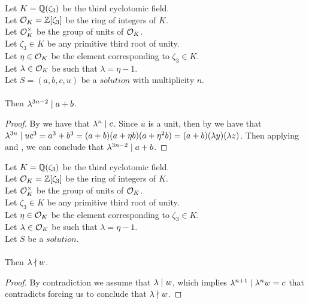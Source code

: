 \begin{lemma}
    \label{lmm:lambda_pow_dvd_a_add_b}
    \leanok
    Let $K = \mathbb{Q}(\zeta_3)$ be the third cyclotomic field. \\
    Let $\mathcal{O}_K = \mathbb{Z}[\zeta_3]$ be the ring of integers of $K$. \\
    Let $\mathcal{O}^\times_K$ be the group of units of $\mathcal{O}_K$. \\
    Let $\zeta_3 \in K$ be any primitive third root of unity. \\
    Let $\eta \in \mathcal{O}_K$ be the element corresponding to $\zeta_3 \in K$. \\
    Let $\lambda \in \mathcal{O}_K$ be such that $\lambda = \eta -1$. \\
    Let $S=(a, b, c, u)$ be a $solution$ with multiplicity $n$.\\\\
    Then $\lambda^{3n -2} \mid a + b$.
\end{lemma}
\begin{proof}
    \leanok
    By  we have that $\lambda^n \mid c$.
    Since $u$ is a unit, then by  we have that
    $\lambda^{3n} \mid u  c^3 = a^3 + b^3 = (a+b)  (a + \eta  b)  (a + \eta^2  b)
    = (a+b)(\lambda y)(\lambda z)$.
    Then applying  and , we can conclude
    that $\lambda^{3n-2} \mid a+b$.
\end{proof}

\begin{lemma}
    \label{lmm:lambda_not_dvd_w}
    \leanok
    Let $K = \mathbb{Q}(\zeta_3)$ be the third cyclotomic field. \\
    Let $\mathcal{O}_K = \mathbb{Z}[\zeta_3]$ be the ring of integers of $K$. \\
    Let $\mathcal{O}^\times_K$ be the group of units of $\mathcal{O}_K$. \\
    Let $\zeta_3 \in K$ be any primitive third root of unity. \\
    Let $\eta \in \mathcal{O}_K$ be the element corresponding to $\zeta_3 \in K$. \\
    Let $\lambda \in \mathcal{O}_K$ be such that $\lambda = \eta -1$. \\
    Let $S$ be a $solution$.\\\\
    Then $\lambda \nmid w$.
\end{lemma}
\begin{proof}
    \leanok
    By contradiction we assume that $\lambda \mid w$, which implies
    $\lambda^{n+1} \mid \lambda^n  w = c$ that contradicts 
    forcing us to conclude that $\lambda \nmid w$.
\end{proof}

